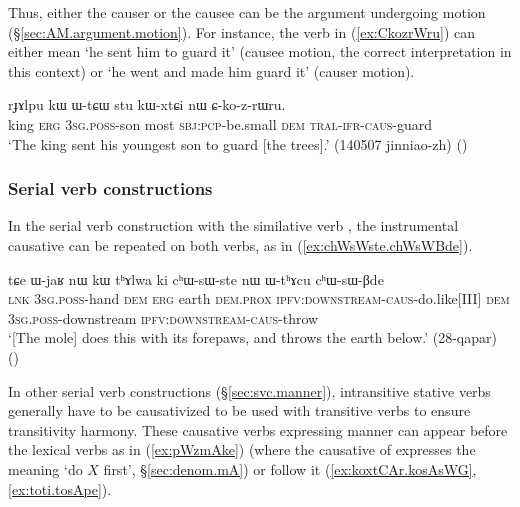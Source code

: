 Thus, either the causer or the causee can be the argument undergoing motion (§\ref{sec:AM.argument.motion}). For instance, the verb  in (\ref{ex:CkozrWru}) can either mean `he sent him to guard it' (causee motion, the correct interpretation in this context) or `he went and made him guard it' (causer motion).

\begin{exe}
\ex \label{ex:CkozrWru}
\gll rɟɤlpu kɯ ɯ-tɕɯ stu kɯ-xtɕi nɯ ɕ-ko-z-rɯru. \\
king \textsc{erg} \textsc{3sg}.\textsc{poss}-son most \textsc{sbj}:\textsc{pcp}-be.small \textsc{dem} \textsc{tral}-\textsc{ifr}-\textsc{caus}-guard \\
\glt `The king sent his youngest son to guard [the trees].' (140507 jinniao-zh)
()
\end{exe}

 
 
\subsubsection{Serial verb constructions} \label{sec:sig.caus.serial}
In the serial verb construction with the similative verb , the instrumental causative can be repeated on both verbs, as in (\ref{ex:chWsWste.chWsWBde}).

\begin{exe}
\ex \label{ex:chWsWste.chWsWBde}
\gll  tɕe ɯ-jaʁ nɯ kɯ tʰɤlwa ki cʰɯ-sɯ-ste nɯ ɯ-tʰɤcu cʰɯ-sɯ-βde \\
\textsc{lnk} \textsc{3sg}.\textsc{poss}-hand \textsc{dem} \textsc{erg} earth \textsc{dem}.\textsc{prox} \textsc{ipfv}:\textsc{downstream}-\textsc{caus}-do.like[III] \textsc{dem} \textsc{3sg}.\textsc{poss}-downstream \textsc{ipfv}:\textsc{downstream}-\textsc{caus}-throw \\
\glt `[The mole] does this with its forepaws, and throws the earth below.' (28-qapar)
()
\end{exe}

In other serial verb constructions (§\ref{sec:svc.manner}), intransitive stative verbs generally have to be causativized to be used with transitive verbs to ensure transitivity harmony. These causative verbs expressing manner can appear before the lexical verbs as in (\ref{ex:pWzmAke}) (where the causative of  expresses the meaning `do $X$ first', §\ref{sec:denom.mA}) or follow it (\ref{ex:koxtCAr.kosAsWG}, \ref{ex:toti.tosApe}).

